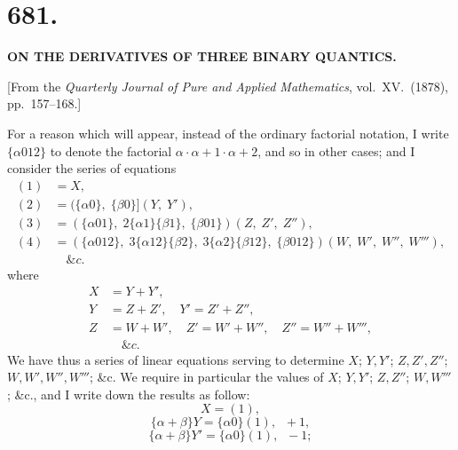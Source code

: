 \documentclass[11pt,a4paper]{article}
\begin{document}

\section*{681.}

\begin{center}
\textbf{ON THE DERIVATIVES OF THREE BINARY QUANTICS.}
\end{center}

\medskip

\begin{center}
[From the \emph{Quarterly Journal of Pure and Applied Mathematics}, vol.~XV.\ (1878), pp.~157--168.]
\end{center}

\medskip

\noindent For a reason which will appear, instead of the ordinary factorial notation, I write $\{\alpha 012\}$ to denote the factorial $\alpha\cdot\alpha + 1\cdot\alpha + 2$, and so in other cases; and I consider the series of equations
\begin{align*}
(1) &= X,\\
(2) &= (\{\alpha 0\},\; \{\beta 0\}](Y,\; Y'),\\
(3) &= (\{\alpha 01\},\; 2\{\alpha 1\}\{\beta 1\},\; \{\beta 01\})(Z,\; Z',\; Z''),\\
(4) &= (\{\alpha 012\},\; 3\{\alpha 12\}\{\beta 2\},\; 3\{\alpha 2\}\{\beta 12\},\; \{\beta 012\})(W,\; W',\; W'',\; W'''),\\
&\quad \&c.
\end{align*}
where
\begin{align*}
X &= Y + Y',\\
Y &= Z + Z',\quad Y' = Z' + Z'',\\
Z &= W + W',\quad Z' = W' + W'',\quad Z'' = W'' + W''',\\
&\quad \&c.
\end{align*}
We have thus a series of linear equations serving to determine $X$; $Y, Y'$; $Z, Z', Z''$; $W, W', W'', W'''$; \&c. We require in particular the values of $X$; $Y, Y'$; $Z, Z''$; $W, W'''$; \&c., and I write down the results as follow:
\[
X = (1),
\]
\[
\{\alpha + \beta\}Y = \{\alpha 0\}(1),\;\; +1,
\]
\[
\{\alpha + \beta\}Y' = \{\alpha 0\}(1),\;\; -1;
\]

\newpage

\end{document}

